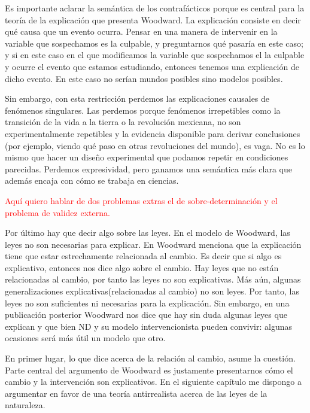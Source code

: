 Es importante aclarar la semántica de los contrafácticos porque es central para la teoría de la explicación que presenta Woodward. La explicación consiste en decir qué causa que un evento ocurra. Pensar en una manera de intervenir en la variable que sospechamos es la culpable, y preguntarnos qué pasaría en este caso; y si en este caso en el que modificamos la variable que sospechamos el la culpable y ocurre el evento que estamos estudiando, entonces tenemos una explicación de dicho evento. En este caso no serían mundos posibles sino modelos posibles.

Sin embargo, con esta restricción perdemos las explicaciones causales de fenómenos singulares. Las perdemos porque fenómenos irrepetibles como la transición de la vida a la tierra o la revolución mexicana, no son experimentalmente repetibles y la evidencia disponible para derivar conclusiones (por ejemplo, viendo qué paso en otras revoluciones del mundo), es vaga. No es lo mismo que hacer un diseño experimental que podamos repetir en condiciones parecidas. Perdemos expresividad, pero ganamos una semántica más clara que además encaja con cómo se trabaja en ciencias.

\textcolor{red}{Aquí quiero hablar de dos problemas extras el de sobre-determinación y el problema de validez externa.}

Por último hay que decir algo sobre las leyes. En el modelo de Woodward, las leyes no son necesarias para explicar. En \cite{Woodward2000} Woodward menciona que la explicación tiene que estar estrechamente relacionada al cambio. Es decir que si algo es explicativo, entonces nos dice algo sobre el cambio. Hay leyes que no están relacionadas al cambio, por tanto las leyes no son explicativas. Más aún, algunas generalizaciones explicativas(relacionadas al cambio) no son leyes. Por tanto, las leyes no son suficientes ni necesarias para la explicación. Sin embargo, en una publicación posterior \citeyear{Woodward2003} Woodward nos dice que hay sin duda algunas leyes que explican y que bien ND y su modelo intervencionista pueden convivir: algunas ocasiones será más útil un modelo que otro.

En primer lugar, lo que dice acerca de la relación al cambio, asume la cuestión. Parte central del argumento de Woodward es justamente presentarnos cómo el cambio y la intervención son explicativos. En el siguiente capítulo me dispongo a argumentar en favor de una teoría antirrealista acerca de las leyes de la naturaleza.





